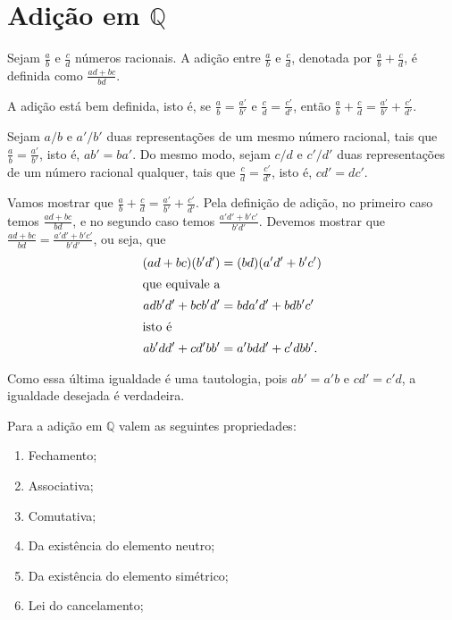 \documentclass[../main.tex]{subfiles}
\begin{document}
\section{Adição em $\mathbb{Q}$}
\begin{defi}\label{rac-def-soma}
    Sejam $\frac{a}{b}$ e $\frac{c}{d}$ números racionais. A adição entre $\frac{a}{b}$ e $\frac{c}{d}$, denotada por $\frac{a}{b} + \frac{c}{d}$, é definida como $\frac{ad+bc}{bd}$.
\end{defi}
\begin{teo}\label{rac-teo-somaBemDefinida}
    A adição está bem definida, isto é, se $\frac{a}{b} = \frac{a'}{b'}$ e $\frac{c}{d} = \frac{c'}{d'}$, então 
    $\frac{a}{b} + \frac{c}{d} = \frac{a'}{b'} + \frac{c'}{d'}.$
\end{teo}
\begin{dem}
    Sejam $a/b$ e $a'/b'$ duas representações de um mesmo número racional, tais que $\frac{a}{b} = \frac{a'}{b'}$, isto é, $ab'=ba'$. Do mesmo modo, sejam $c/d$ e $c'/d'$ duas representações de um número racional qualquer, tais que $\frac{c}{d} = \frac{c'}{d'}$, isto é, $cd' = dc'$.
    
    Vamos mostrar que $\frac{a}{b} + \frac{c}{d} = \frac{a'}{b'} + \frac{c'}{d'}$.
    Pela definição de adição, no primeiro caso temos $\frac{ad+bc}{bd}$, e no segundo caso temos $\frac{a'd'+b'c'}{b'd'}$.
    Devemos mostrar que $\frac{ad+bc}{bd} = \frac{a'd'+b'c'}{b'd'}$, ou seja, que 
    \begin{align*}
        (ad+bc)(b'd') &= (bd)(a'd'+b'c') \\ \shortintertext{que equivale a}
        adb'd'+bcb'd' &= bda'd' + bdb'c' \\ \shortintertext{isto é}
        ab'dd' + cd'bb' &= a'bdd' + c'dbb'.
    \end{align*}
       
    Como essa última igualdade é uma tautologia, pois $ab' = a'b$ e $cd' = c'd$, a igualdade desejada é verdadeira.
\end{dem}
\begin{teo}\label{rac-teo-somaPropriedades}
    Para a adição em $\mathbb{Q}$ valem as seguintes propriedades:
    \begin{enumerate}[label=(\roman*)]
        \item Fechamento;
        \item Associativa;
        \item Comutativa;
        \item Da existência do elemento neutro; 
        \item Da existência do elemento simétrico;
        \item Lei do cancelamento;
    \end{enumerate}
\end{teo}
\end{document}
